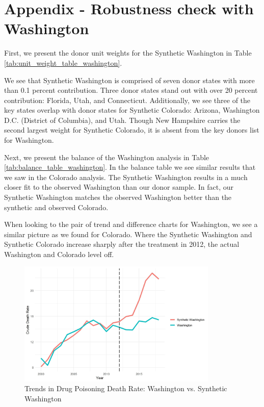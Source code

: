 \documentclass{article}
\begin{document}
\newpage

\section{Appendix - Robustness check with Washington}

First, we present the donor unit weights for the Synthetic Washington in Table \ref{tab:unit_weight_table_washington}.



We see that Synthetic Washington is comprised of seven donor states with more than 0.1 percent contribution. Three donor states stand out with over 20 percent contribution: Florida, Utah, and Connecticut. Additionally, we see three of the key states overlap with donor states for Synthetic Colorado: Arizona, Washington D.C. (District of Columbia), and Utah. Though New Hampshire carries the second largest weight for Synthetic Colorado, it is absent from the key donors list for Washington.

Next, we present the balance of the Washington analysis in Table \ref{tab:balance_table_washington}. In the balance table we see similar results that we saw in the Colorado analysis. The Synthetic Washington results in a much closer fit to the observed Washington than our donor sample. In fact, our Synthetic Washington matches the observed Washington better than the synthetic and observed Colorado. 



When looking to the pair of trend and difference charts for Washington, we see a similar picture as we found for Colorado. Where the Synthetic Washington and Synthetic Colorado increase sharply after the treatment in 2012, the actual Washington and Colorado level off.

\begin{figure}[H]
	\begin{center}
		\includegraphics[width=0.85\textwidth]{trends_plot_washington}
	\end{center}
	\caption{Trends in Drug Poisoning Death Rate: Washington vs. Synthetic Washington}
	\label{fig:trends_plot_washington}
\end{figure}
\end{document}
